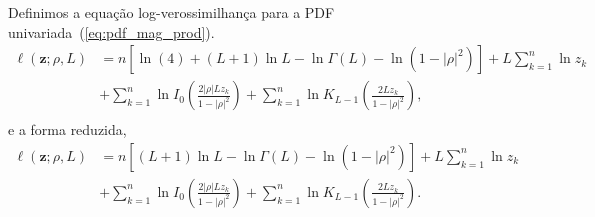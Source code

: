 Definimos a equação log-verossimilhança para a PDF univariada~(\ref{eq:pdf_mag_prod}).
\begin{equation}\nonumber
\begin{split}
    \ell(\bm z;\rho, L)&=n\left[\ln (4)+(L+1)\ln L-\ln\Gamma(L)-\ln(1-|\rho|^2)\right]+L\sum_{k=1}^{n} \ln z_k\\
                         &+\sum_{k=1}^{n}\ln I_0\left(\frac{2|\rho|Lz_k}{1-|\rho|^2}\right)+ \sum_{k=1}^{n}\ln K_{L-1}\left(\frac{2Lz_k}{1-|\rho|^2}\right),\\
\end{split}
 \end{equation}
e a forma reduzida,
\begin{equation}\label{eq:eq_log_vero_mag_prod_red}
\begin{split}
    \ell(\bm z;\rho, L)&=n\left[(L+1)\ln L-\ln\Gamma(L)-\ln(1-|\rho|^2)\right]+L\sum_{k=1}^{n} \ln z_k\\
                         &+\sum_{k=1}^{n}\ln I_0\left(\frac{2|\rho|L z_k}{1-|\rho|^2}\right)+ \sum_{k=1}^{n}\ln K_{L-1}\left(\frac{2Lz_k}{1-|\rho|^2}\right).\\
\end{split}
 \end{equation} 


